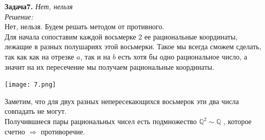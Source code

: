 \documentclass[12pt,a4paper]{scrartcl}
\begin{document}
 
\noindent \textbf{Задача7.} 
\textit{Нет, нельзя} \\
\textit{Решение:}\\
Нет, нельзя. Будем решать методом от противного.\\
Для начала сопоставим каждой восьмерке 2 ее рациональные координаты, лежащие в разных полушариях этой восьмерки. Такое мы всегда сможем сделать, так как как на отрезке $a$, так и на $b$ есть хотя бы одно рациональное число, а значит на их пересечение мы получаем рациональные координаты. \\
\begin{center}
	\texttt{[image: 7.png]}	
\end{center}
Заметим, что для двух разных непересекающихся восьмерок эти два числа совпадать не могут.\\
Получившиеся пары рациональных чисел есть подмножество $\mathbb{Q}^2 \sim \mathbb{Q}$ , которое счетно $\Rightarrow$ противоречие.
\end{document}
